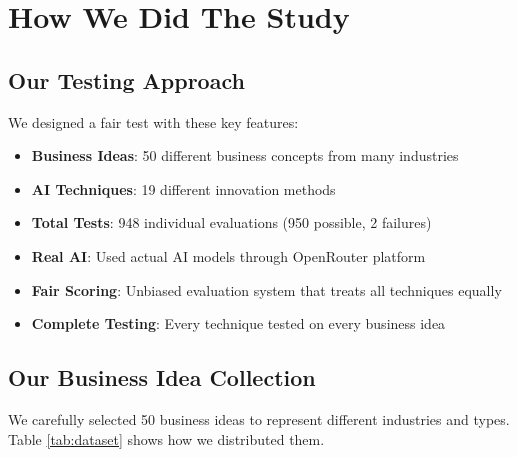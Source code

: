 \documentclass[12pt]{article}
\begin{document}
\section{How We Did The Study}

\subsection{Our Testing Approach}

We designed a fair test with these key features:

\begin{itemize}
\item \textbf{Business Ideas}: 50 different business concepts from many industries
\item \textbf{AI Techniques}: 19 different innovation methods
\item \textbf{Total Tests}: 948 individual evaluations (950 possible, 2 failures)
\item \textbf{Real AI}: Used actual AI models through OpenRouter platform
\item \textbf{Fair Scoring}: Unbiased evaluation system that treats all techniques equally
\item \textbf{Complete Testing}: Every technique tested on every business idea
\end{itemize}

\subsection{Our Business Idea Collection}

We carefully selected 50 business ideas to represent different industries and types. Table \ref{tab:dataset} shows how we distributed them.
\end{document}
